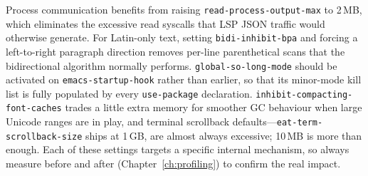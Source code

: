 Process communication benefits from raising
\texttt{read-process-output-max} to 2\,MB, which eliminates the
excessive read syscalls that LSP JSON traffic would otherwise generate.
For Latin-only text, setting \texttt{bidi-inhibit-bpa} and forcing a
left-to-right paragraph direction removes per-line parenthetical scans
that the bidirectional algorithm normally performs.
\texttt{global-so-long-mode} should be activated on
\texttt{emacs-startup-hook} rather than earlier, so that its minor-mode
kill list is fully populated by every \texttt{use-package} declaration.
\texttt{inhibit-compacting-font-caches} trades a little extra memory for
smoother GC behaviour when large Unicode ranges are in play, and
terminal scrollback defaults---\texttt{eat-term-scrollback-size} ships at
1\,GB, are almost always excessive; 10\,MB is more than enough.  Each
of these settings targets a specific internal mechanism, so always
measure before and after (Chapter~\ref{ch:profiling}) to confirm the
real impact.
